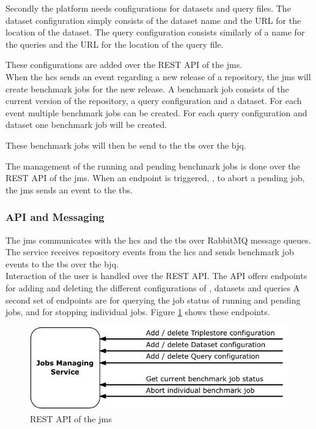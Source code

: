 Secondly the platform needs configurations for datasets and query files.
The dataset configuration simply consists of the dataset name and the URL for the location of the dataset.
The query configuration consists similarly of a name for the queries and the URL for the location of the query file.

These configurations are added over the REST API of the \ac{jms}.
\\

When the \ac{hcs} sends an event regarding a new release of a repository, the \ac{jms} will create benchmark jobs for the new release.
A benchmark job consists of the current version of the repository, a query configuration and a dataset.
For each event multiple benchmark jobs can be created.
For each query configuration and dataset one benchmark job will be created.

These benchmark jobs will then be send to the \acl{tbs} over the \acl{bjq}.

The management of the running and pending benchmark jobs is done over the REST API of the \ac{jms}.
When an endpoint is triggered, \eg, to abort a pending job, the \ac{jms} sends an event to the \acl{tbs}.


\subsubsection{API and Messaging}
\label{sec:jobs_api}
The \ac{jms} communicates with the \ac{hcs} and the \acl{tbs} over RabbitMQ message queues.
The service receives repository events from the \ac{hcs} and sends benchmark job events to the \acl{tbs} over the \ac{bjq}.
\\

Interaction of the user is handled over the REST API.
The API offers endpoints for adding and deleting the different configurations of \tsp{}, datasets and queries
A second set of endpoints are for querying the job status of running and pending jobs, and for stopping individual jobs.
Figure \ref{fig:rest_apis_approach_jms} shows these endpoints.
\begin{figure}[tbph]
	\centering
	\includegraphics[width=.57\textwidth]{figures/rest-apis-approach-jms.pdf}
	\caption{REST API of the \acl{jms}}
	\label{fig:rest_apis_approach_jms}
\end{figure}


